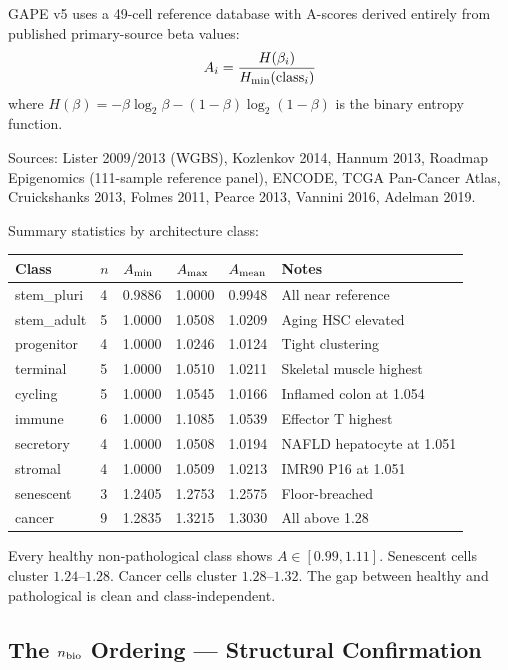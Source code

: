 \documentclass[12pt,a4paper]{article}
\begin{document}
GAPE v5 uses a 49-cell reference database with A-scores derived entirely
from published primary-source beta values:
\begin{equation}
A_i = \frac{H(\beta_i)}{H_{\rm min}(\text{class}_i)}
\end{equation}
where $H(\beta) = -\beta\log_2\beta - (1-\beta)\log_2(1-\beta)$
is the binary entropy function.

Sources: Lister 2009/2013 (WGBS), Kozlenkov 2014, Hannum 2013,
Roadmap Epigenomics (111-sample reference panel),
ENCODE, TCGA Pan-Cancer Atlas, Cruickshanks 2013,
Folmes 2011, Pearce 2013, Vannini 2016, Adelman 2019.

\noindent Summary statistics by architecture class:

\begin{center}
\renewcommand{\arraystretch}{1.2}
\begin{tabular}{llllll}
\toprule
\textbf{Class} & $n$ & $A_{\rm min}$ & $A_{\rm max}$ & $A_{\rm mean}$ & \textbf{Notes} \\
\midrule
stem\_pluri & 4 & 0.9886 & 1.0000 & 0.9948 & All near reference \\
stem\_adult & 5 & 1.0000 & 1.0508 & 1.0209 & Aging HSC elevated \\
progenitor  & 4 & 1.0000 & 1.0246 & 1.0124 & Tight clustering \\
terminal    & 5 & 1.0000 & 1.0510 & 1.0211 & Skeletal muscle highest \\
cycling     & 5 & 1.0000 & 1.0545 & 1.0166 & Inflamed colon at 1.054 \\
immune      & 6 & 1.0000 & 1.1085 & 1.0539 & Effector T highest \\
secretory   & 4 & 1.0000 & 1.0508 & 1.0194 & NAFLD hepatocyte at 1.051 \\
stromal     & 4 & 1.0000 & 1.0509 & 1.0213 & IMR90 P16 at 1.051 \\
senescent   & 3 & 1.2405 & 1.2753 & 1.2575 & Floor-breached \\
cancer      & 9 & 1.2835 & 1.3215 & 1.3030 & All above 1.28 \\
\bottomrule
\end{tabular}
\end{center}

\noindent Every healthy non-pathological class shows $A \in [0.99, 1.11]$.
Senescent cells cluster $1.24$--$1.28$. Cancer cells cluster $1.28$--$1.32$.
The gap between healthy and pathological is clean and class-independent.

\subsection{The $n_{\rm bio}$ Ordering --- Structural Confirmation}
\label{subsec:nbio_order}
\end{document}
